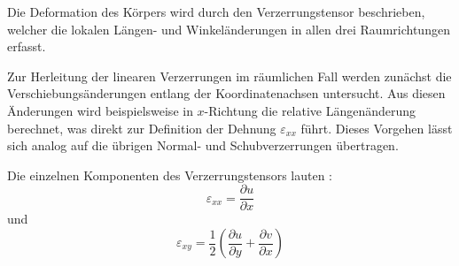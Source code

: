 Die Deformation des Körpers wird durch den Verzerrungstensor beschrieben, welcher die lokalen Längen- und Winkeländerungen in allen drei Raumrichtungen erfasst.

Zur Herleitung der linearen Verzerrungen im räumlichen Fall werden zunächst die Verschiebungsänderungen entlang der Koordinatenachsen untersucht. 
Aus diesen Änderungen wird beispielsweise in $x$-Richtung die relative Längenänderung berechnet, was direkt zur Definition der Dehnung $\varepsilon_{xx}$ führt. 
Dieses Vorgehen lässt sich analog auf die übrigen Normal- und Schubverzerrungen übertragen.

Die einzelnen Komponenten des Verzerrungstensors lauten \cite{elastomechanik:Technische Mechanik 2:Elastostatik}:
	\begin{equation}
		\varepsilon_{xx} =
		\frac{\partial u}{\partial x}
	\end{equation}
	und
	\begin{equation}
		\varepsilon_{xy} =
		\frac{1}{2} \left( \frac{\partial u}{\partial y} + \frac{\partial v}{\partial x} \right)
	\end{equation}

